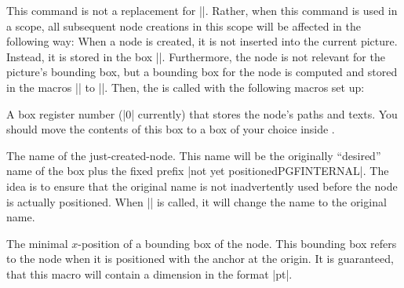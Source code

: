 \begin{command}{\pgfpositionnodelater{}}
    This command is not a replacement for |\pgfnode|. Rather, when this command
    is used in a scope, all subsequent node creations in this scope will be
    affected in the following way:  When a node is created, it is not inserted
    into the current picture. Instead, it is stored in the box
    |\pgfpositionnodelaterbox|. Furthermore, the node is not relevant for the
    picture's bounding box, but a bounding box for the node is computed and
    stored in the macros |\pgfpositionnodelaterminx| to
    |\pgfpositionnodelatermaxy|. Then, the  is called with the
    following macros set up:

    \begin{command}{\pgfpositionnodelaterbox}
        A box register number (|0| currently) that stores the node's paths and
        texts. You should move the contents of this box to a box of your choice
        inside .
    \end{command}

    \begin{command}{\pgfpositionnodelatername}
        The name of the just-created-node. This name will be the originally
        ``desired'' name of the box plus the fixed prefix
        |not yet positionedPGFINTERNAL|. The idea is to ensure that the
        original name is not inadvertently used before the node is actually
        positioned. When |\pgfpositionnodenow| is called, it will change the
        name to the
        original name.
    \end{command}

    \begin{command}{\pgfpositionnodelaterminx}
        The minimal $x$-position of a bounding box of the node. This bounding
        box refers to the node when it is positioned with the anchor at the
        origin. It is guaranteed, that this macro will contain a dimension in
        the format |pt|.
    \end{command}
    \begin{command}{\pgfpositionnodelaterminy}
    \end{command}
    \begin{command}{\pgfpositionnodelatermaxx}
    \end{command}
    \begin{command}{\pgfpositionnodelatermaxy}
    \end{command}


\end{command}
